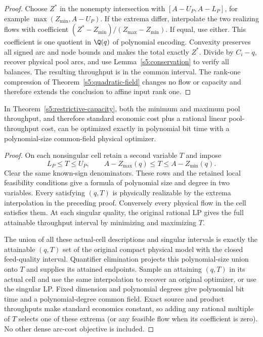 \begin{proof}
Choose $Z^*$ in the nonempty intersection with $[A-U_P,A-L_P]$, for
example $\max(Z_{\min},A-U_P)$. If the extrema differ, interpolate the
two realizing flows with coefficient
$(Z^*-Z_{\min})/(Z_{\max}-Z_{\min})$. If equal, use either. This
coefficient is one quotient in $\Q(q)$ of polynomial encoding.
Convexity preserves all signed arc and node bounds and makes the total
exactly $Z^*$. Divide by $C_i-q$, recover physical pool arcs, and use
Lemma~\ref{s5:conservation} to verify all balances. The resulting
throughput is in the common interval. The rank-one compression of
Theorem~\ref{s5:quadratic-field} changes no flow or capacity and therefore
extends the conclusion to affine input rank one.
\end{proof}

\begin{corollary}
\label{s5:throughput-optimization}
In Theorem~\ref{s5:restrictive-capacity}, both the minimum and maximum
pool throughput, and therefore standard economic cost plus a rational
linear pool-throughput cost, can be optimized exactly in polynomial bit
time with a polynomial-size common-field physical optimizer.
\end{corollary}
\begin{proof}
On each nonsingular cell retain a second variable $T$ and impose
\[
 L_P\le T\le U_P,\qquad
 A-Z_{\max}(q)\le T\le A-Z_{\min}(q).
\]
Clear the same known-sign denominators. These rows and the retained
local feasibility conditions give a formula of polynomial size and
degree in two variables. Every satisfying $(q,T)$ is physically
realizable by the extrema interpolation in the preceding proof.
Conversely every physical flow in the cell satisfies them. At each
singular quality, the original rational LP gives the full attainable
throughput interval by minimizing and maximizing $T$.

The union of all these actual-cell descriptions and singular intervals
is exactly the attainable $(q,T)$ set of the original compact physical
model with the closed feed-quality interval. Quantifier elimination
projects this polynomial-size union onto $T$ and supplies its attained
endpoints. Sample an attaining $(q,T)$ in its actual cell and use the
same interpolation to recover an original optimizer, or use the
singular LP. Fixed dimension and polynomial degrees give polynomial bit
time and a polynomial-degree common field. Exact source and product
throughputs make standard economics constant, so adding any rational
multiple of $T$ selects one of these extrema (or any feasible flow when
its coefficient is zero). No other dense arc-cost objective is included.
\end{proof}

